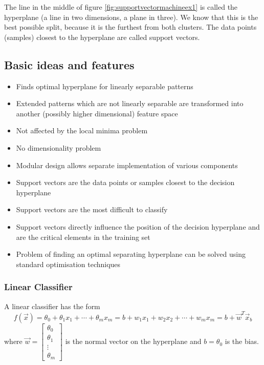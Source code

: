 \documentclass[a4paper, 11pt]{article}
\begin{document}
The line in the middle of figure \ref{fig:supportvectormachineex1} is called the hyperplane (a line in two dimensions, a plane in three). We know that this is the best possible split, because it is the furthest from both clusters. The data points (samples) closest to the hyperplane are called support vectors.

\subsection{Basic ideas and features}

\begin{itemize}
	\item Finds optimal hyperplane for linearly separable patterns
	\item Extended patterns which are not linearly separable are transformed into another (possibly higher dimensional) feature space
	\item Not affected by the local minima problem
	\item No dimensionality problem
	\item Modular design allows separate implementation of various components
	\item Support vectors are the data points or samples closest to the decision hyperplane
	\item Support vectors are the most difficult to classify
	\item Support vectors directly influence the position of the decision hyperplane and are the critical elements in the training set
	\item Problem of finding an optimal separating hyperplane can be solved using standard optimisation techniques
\end{itemize}

\subsubsection{Linear Classifier}
A linear classifier has the form
\begin{equation}
	f(\vec{x}) = \theta_0 + \theta_1 x_1 + \cdots + \theta_m x_m = b + w_1 x_1 + w_2 x_2 + \cdots + w_m x_m = b + \vec{w}^T \vec{x}_b
\end{equation}
\noindent
where $\vec{w} = \begin{bmatrix}
	\theta_0\\\theta_1\\\vdots\\\theta_m
\end{bmatrix}$ is the normal vector on the hyperplane and $b = \theta_0$ is the bias.
\end{document}

